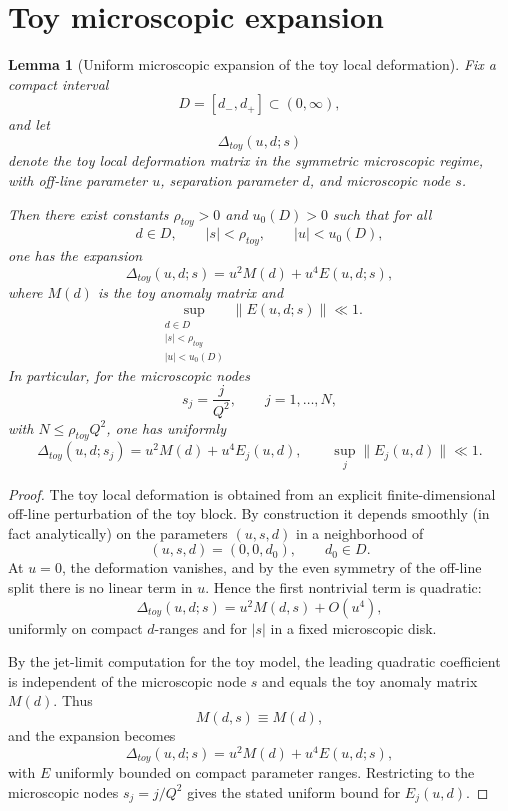 \documentclass[11pt,a4paper]{amsart}
\def\toy{toy}%
\theoremstyle{plain}
\newtheorem{lemma}[theorem]{Lemma}
\theoremstyle{definition}
\newcommand{\toy}{\mathrm{toy}}
\begin{document}
\appendix

\section{Toy microscopic expansion}
\label{app:toy-microscopic-expansion}

\begin{lemma}[Uniform microscopic expansion of the toy local deformation]
\label{lem:toy-microscopic-expansion}
Fix a compact interval
\[
D=[d_-,d_+]\subset(0,\infty),
\]
and let
\[
\Delta_{\toy}(u,d;s)
\]
denote the toy local deformation matrix in the symmetric microscopic regime,
with off-line parameter $u$, separation parameter $d$, and microscopic node
$s$.

Then there exist constants $\rho_{\toy}>0$ and $u_0(D)>0$ such that for all
\[
d\in D,
\qquad
|s|<\rho_{\toy},
\qquad
|u|<u_0(D),
\]
one has the expansion
\[
\Delta_{\toy}(u,d;s)=u^2M(d)+u^4E(u,d;s),
\]
where $M(d)$ is the toy anomaly matrix and
\[
\sup_{\substack{d\in D\\ |s|<\rho_{\toy}\\ |u|<u_0(D)}} \|E(u,d;s)\|\ll 1.
\]
In particular, for the microscopic nodes
\[
s_j=\frac{j}{Q^2},
\qquad
j=1,\dots,N,
\]
with $N\le \rho_{\toy}Q^2$, one has uniformly
\[
\Delta_{\toy}(u,d;s_j)=u^2M(d)+u^4E_j(u,d),
\qquad
\sup_j \|E_j(u,d)\|\ll 1.
\]
\end{lemma}

\begin{proof}
The toy local deformation is obtained from an explicit finite-dimensional
off-line perturbation of the toy block. By construction it depends smoothly
(in fact analytically) on the parameters $(u,s,d)$ in a neighborhood of
\[
(u,s,d)=(0,0,d_0),
\qquad d_0\in D.
\]
At $u=0$, the deformation vanishes, and by the even symmetry of the off-line
split there is no linear term in $u$. Hence the first nontrivial term is
quadratic:
\[
\Delta_{\toy}(u,d;s)=u^2M(d,s)+O(u^4),
\]
uniformly on compact $d$-ranges and for $|s|$ in a fixed microscopic disk.

By the jet-limit computation for the toy model, the leading quadratic
coefficient is independent of the microscopic node $s$ and equals the toy
anomaly matrix $M(d)$. Thus
\[
M(d,s)\equiv M(d),
\]
and the expansion becomes
\[
\Delta_{\toy}(u,d;s)=u^2M(d)+u^4E(u,d;s),
\]
with $E$ uniformly bounded on compact parameter ranges. Restricting to the
microscopic nodes $s_j=j/Q^2$ gives the stated uniform bound for
$E_j(u,d)$.
\end{proof}
\end{document}
